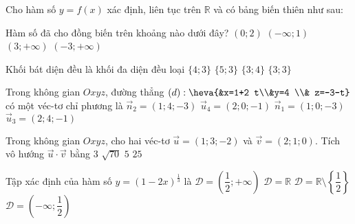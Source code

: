 \begin{ex}%
	Cho hàm số $y=f(x)$ xác định, liên tục trên $\mathbb{R}$ và có bảng biến thiên như sau:
	\begin{center}
	\end{center}
	Hàm số đã cho đồng biến trên khoảng nào dưới đây?
	\choice
	{$(0; 2)$}
	{$(-\infty; 1)$}
	{\True $(3;+\infty)$}
	{$(-3;+\infty)$}
\end{ex}
\begin{ex}%
	Khối bát diện đều là khối đa diện đều loại
	\choice
	{$\{4; 3\}$}
	{$\{5; 3\}$}
	{\True $\{3; 4\}$}
	{$\{3; 3\}$}
\end{ex}

\begin{ex}%
	Trong không gian $Oxyz$, đường thẳng $(d):\heva{&x=1+2 t\\&y=4 \\& z=-3-t}$ có một véc-tơ chỉ phương là
	\choice
	{$\vec{n}_2=(1; 4;-3)$}
	{\True $\vec{u}_4=(2; 0;-1)$}
	{$\vec{n}_1=(1; 0;-3)$}
	{$\vec{u}_3=(2; 4;-1)$}
\end{ex}
\begin{ex}%
	Trong không gian $Oxyz$, cho hai véc-tơ $\vec{u}=(1; 3;-2)$ và $\vec{v}=(2; 1; 0)$. Tích vô hướng $\vec{u}\cdot \vec{v}$ bằng
	\choice
	{$3$}
	{$\sqrt{70}$}
	{\True $5$}
	{$25$}
\end{ex}
\begin{ex}%
	Tập xác định của hàm số $y=(1-2x)^{\frac{1}{3}}$ là
	\choice
	{$\mathscr{D}=\left(\dfrac{1}{2};+\infty\right)$}
	{$\mathscr{D}=\mathbb{R}$}
	{$\mathscr{D}=\mathbb{R}\setminus \left\{\dfrac{1}{2}\right\}$}
	{\True $\mathscr{D}=\left(-\infty; \dfrac{1}{2}\right)$}
\end{ex}

